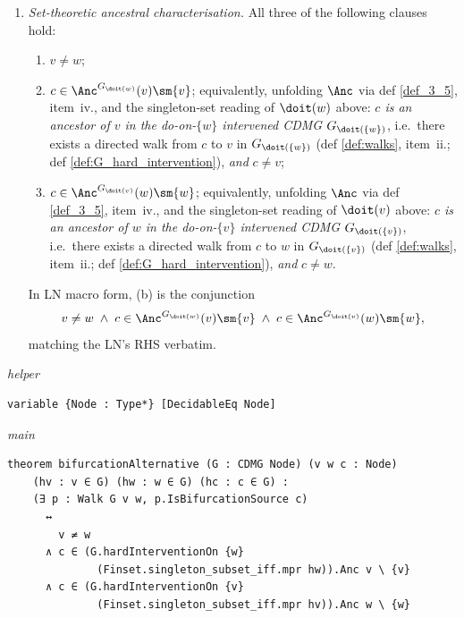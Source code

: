 {\begin{Prp}[BifurcationAlternative]
\begin{enumerate}[label=(\alph*)]
        \item \emph{Set-theoretic ancestral characterisation.}
              All three of the following clauses hold:
              \begin{enumerate}[label=(\roman*)]
                  \item $v \ne w$;
                  \item $c \in \Anc^{G_{\doit(w)}}(v) \sm \{v\}$;
                        equivalently, unfolding $\Anc$ via def
                        \ref{def_3_5}, item~iv., and the singleton-set
                        reading of $\doit(w)$ above: \emph{$c$ is an
                        ancestor of $v$ in the do-on-$\{w\}$ intervened
                        CDMG $G_{\doit(\{w\})}$}, i.e.\ there exists a
                        directed walk from $c$ to $v$ in
                        $G_{\doit(\{w\})}$ (def \ref{def:walks},
                        item~ii.; def \ref{def:G_hard_intervention}),
                        \emph{and} $c \ne v$;
                  \item $c \in \Anc^{G_{\doit(v)}}(w) \sm \{w\}$;
                        equivalently, unfolding $\Anc$ via def
                        \ref{def_3_5}, item~iv., and the singleton-set
                        reading of $\doit(v)$ above: \emph{$c$ is an
                        ancestor of $w$ in the do-on-$\{v\}$ intervened
                        CDMG $G_{\doit(\{v\})}$}, i.e.\ there exists a
                        directed walk from $c$ to $w$ in
                        $G_{\doit(\{v\})}$ (def \ref{def:walks},
                        item~ii.; def \ref{def:G_hard_intervention}),
                        \emph{and} $c \ne w$.
              \end{enumerate}
              In LN macro form, (b) is the conjunction
              \[
                  v \ne w \;\land\;
                  c \in \Anc^{G_{\doit(w)}}(v) \sm \{v\} \;\land\;
                  c \in \Anc^{G_{\doit(v)}}(w) \sm \{w\},
              \]
              matching the LN's RHS verbatim.
    \end{enumerate}
\end{Prp}
\par}
\smallskip
{\small\textit{helper}}
\begin{verbatim}
variable {Node : Type*} [DecidableEq Node]
\end{verbatim}
{\small\textit{main}}
\begin{verbatim}
theorem bifurcationAlternative (G : CDMG Node) (v w c : Node)
    (hv : v ∈ G) (hw : w ∈ G) (hc : c ∈ G) :
    (∃ p : Walk G v w, p.IsBifurcationSource c)
      ↔
        v ≠ w
      ∧ c ∈ (G.hardInterventionOn {w}
              (Finset.singleton_subset_iff.mpr hw)).Anc v \ {v}
      ∧ c ∈ (G.hardInterventionOn {v}
              (Finset.singleton_subset_iff.mpr hv)).Anc w \ {w}
\end{verbatim}
~%

